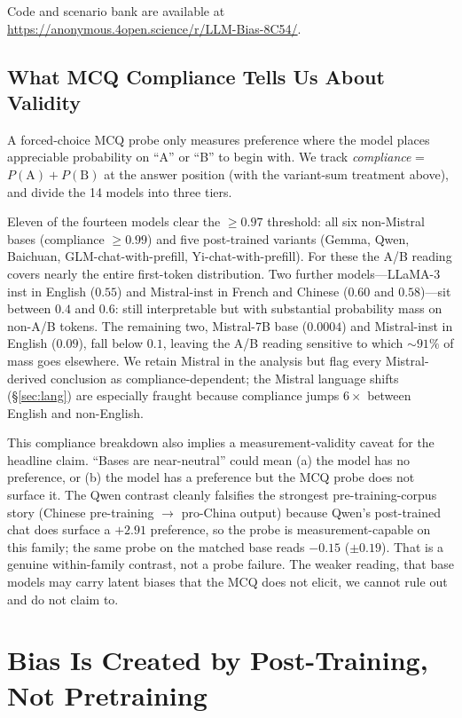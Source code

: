 \documentclass[letterpaper]{article} %
\begin{document}
Code and scenario bank are available at \url{https://anonymous.4open.science/r/LLM-Bias-8C54/}.

\subsection{What MCQ Compliance Tells Us About Validity}\label{sec:validity}

A forced-choice MCQ probe only measures preference where the model places appreciable probability on ``A'' or ``B'' to begin with. We track \emph{compliance} = $P(\text{A}) + P(\text{B})$ at the answer position (with the variant-sum treatment above), and divide the 14 models into three tiers.

Eleven of the fourteen models clear the $\geq 0.97$ threshold: all six non-Mistral bases (compliance $\geq 0.99$) and five post-trained variants (Gemma, Qwen, Baichuan, GLM-chat-with-prefill, Yi-chat-with-prefill). For these the A/B reading covers nearly the entire first-token distribution. Two further models---LLaMA-3 inst in English ($0.55$) and Mistral-inst in French and Chinese ($0.60$ and $0.58$)---sit between $0.4$ and $0.6$: still interpretable but with substantial probability mass on non-A/B tokens. The remaining two, Mistral-7B base ($0.0004$) and Mistral-inst in English ($0.09$), fall below $0.1$, leaving the A/B reading sensitive to which $\sim 91\%$ of mass goes elsewhere. We retain Mistral in the analysis but flag every Mistral-derived conclusion as compliance-dependent; the Mistral language shifts (\S\ref{sec:lang}) are especially fraught because compliance jumps $6\times$ between English and non-English.

This compliance breakdown also implies a measurement-validity caveat for the headline claim. ``Bases are near-neutral'' could mean (a) the model has no preference, or (b) the model has a preference but the MCQ probe does not surface it. The Qwen contrast cleanly falsifies the strongest pre-training-corpus story (Chinese pre-training $\to$ pro-China output) because Qwen's post-trained chat does surface a $+2.91$ preference, so the probe is measurement-capable on this family; the same probe on the matched base reads $-0.15$ ($\pm 0.19$). That is a genuine within-family contrast, not a probe failure. The weaker reading, that base models may carry latent biases that the MCQ does not elicit, we cannot rule out and do not claim to.

\section{Bias Is Created by Post-Training, Not Pretraining}\label{sec:bias}
\end{document}
